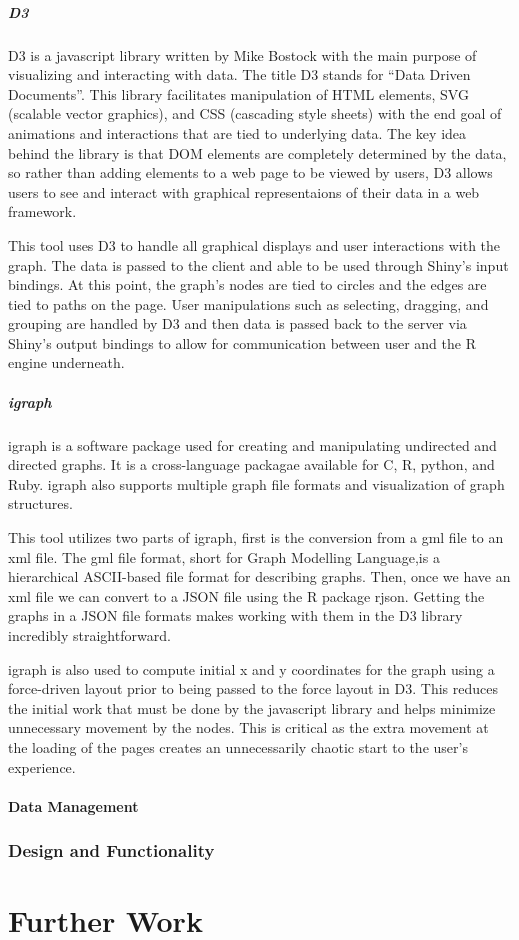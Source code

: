 \documentclass{article}\usepackage{graphicx, color}
\begin{document}
\subsubsection{D3}
D3 is a javascript library written by Mike Bostock with the main purpose of visualizing and interacting with data. The title D3 stands for ``Data Driven Documents”. This library facilitates manipulation of HTML elements, SVG (scalable vector graphics), and CSS (cascading style sheets) with the end goal of animations and interactions that are tied to underlying data. The key idea behind the library is that DOM elements are completely determined by the data, so rather than adding elements to a web page to be viewed by users, D3 allows users to see and interact with graphical representaions of their data in a web framework. 

This tool uses D3 to handle all graphical displays and user interactions with the graph. The data is passed to the client and able to be used through Shiny's input bindings. At this point, the graph’s nodes are tied to circles and the edges are tied to paths on the page. User manipulations such as selecting, dragging, and grouping are handled by D3 and then data is passed back to the server via Shiny's output bindings to allow for communication between user and the R engine underneath.


\subsubsection{igraph}
igraph is a software package used for creating and manipulating undirected and directed graphs. It is a cross-language packagae available for C, R, python, and Ruby. igraph also supports multiple graph file formats and visualization of graph structures.

This tool utilizes two parts of igraph, first is the conversion from a gml file to an xml file. The gml file format, short for Graph Modelling Language,is a hierarchical ASCII-based file format for describing graphs. Then, once we have an xml file we can convert to a JSON file using the R package rjson. Getting the graphs in a JSON file formats makes working with them in the D3 library incredibly straightforward. 

igraph is also used to compute initial x and y coordinates for the graph using a force-driven layout prior to being passed to the force layout in D3. This reduces the initial work that must be done by the javascript library and helps minimize unnecessary movement by the nodes. This is critical as the extra movement at the loading of the pages creates an unnecessarily chaotic start to the user's experience.



\subsection{Data Management}
\section{Design and Functionality}

\part{Further Work}
\end{document}
